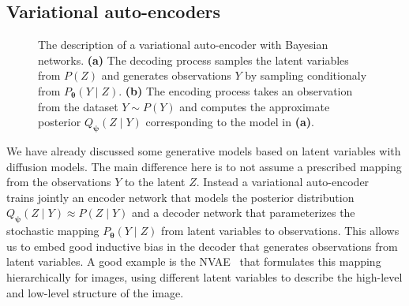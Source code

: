 \subsection{Variational auto-encoders}
\begin{figure*}
    \centering
    \begin{subfigure}{.45\textwidth}
  \centering
  \caption{}
  \label{}
\end{subfigure}
\begin{subfigure}{.45\textwidth}
\centering
{}
\caption{}
\label{}
\end{subfigure}
\caption{The description of a variational auto-encoder with Bayesian networks. \textbf{(a)} The decoding process samples the latent variables from $P(Z)$ and generates observations $Y$ by sampling conditionaly from $P_{\mathbf{\theta}}(Y\mid Z)$. \textbf{(b)} The encoding process takes an observation from the dataset $Y \sim P(Y)$ and computes the approximate posterior $Q_{\bm \psi}(Z\mid Y)$ corresponding to the model in \textbf{(a)}.}
\end{figure*}

We have already discussed some generative models based on latent variables with diffusion models. The main difference here is to not assume a prescribed mapping from the observations $Y$ to the latent $Z$. Instead a variational auto-encoder~\citep[VAE, ][]{kingma_auto-encoding_2013} trains jointly an encoder network that models the posterior distribution $Q_{\bm \psi}(Z\mid Y) \approx P(Z\mid Y) $ and a decoder network that parameterizes the stochastic mapping $P_{\bm \theta}(Y\mid Z)$ from latent variables to observations. This allows us to embed good inductive bias in the decoder that generates observations from latent variables. A good example is the NVAE~\citep{vahdat_nvae_2020} that formulates this mapping hierarchically for images, using different latent variables to describe the high-level and low-level structure of the image.

